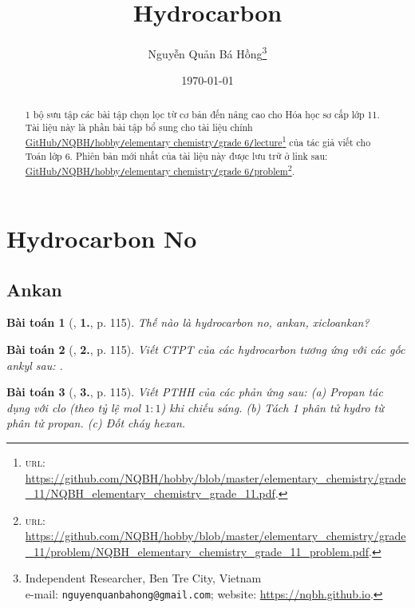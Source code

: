 \documentclass{article}
\title{Hydrocarbon}
\author{Nguyễn Quản Bá Hồng\footnote{Independent Researcher, Ben Tre City, Vietnam\\e-mail: \texttt{nguyenquanbahong@gmail.com}; website: \url{https://nqbh.github.io}.}}
\date{\today}
\numberwithin{equation}{section}
\newtheorem{baitoan}{Bài toán}[section]
\begin{document}
\maketitle
\begin{abstract}
	1 bộ sưu tập các bài tập chọn lọc từ cơ bản đến nâng cao cho Hóa học sơ cấp lớp 11. Tài liệu này là phần bài tập bổ sung cho tài liệu chính \href{https://github.com/NQBH/hobby/blob/master/elementary_chemistry/grade_11/NQBH_elementary_chemistry_grade_11.pdf}{GitHub\texttt{/}NQBH\texttt{/}hobby\texttt{/}elementary chemistry\texttt{/}grade 6\texttt{/}lecture}\footnote{\textsc{url}: \url{https://github.com/NQBH/hobby/blob/master/elementary_chemistry/grade_11/NQBH_elementary_chemistry_grade_11.pdf}.} của tác giả viết cho Toán lớp 6. Phiên bản mới nhất của tài liệu này được lưu trữ ở link sau: \href{https://github.com/NQBH/hobby/blob/master/elementary_chemistry/grade_11/problem/NQBH_elementary_chemistry_grade_11_problem.pdf}{GitHub\texttt{/}NQBH\texttt{/}hobby\texttt{/}elementary chemistry\texttt{/}grade 6\texttt{/}problem}\footnote{\textsc{url}: \url{https://github.com/NQBH/hobby/blob/master/elementary_chemistry/grade_11/problem/NQBH_elementary_chemistry_grade_11_problem.pdf}.}.
\end{abstract}
\tableofcontents
\newpage


\section{Hydrocarbon No}

\subsection{Ankan}

\begin{baitoan}[\cite{SGK_Hoa_Hoc_11_co_ban}, \textbf{1.}, p. 115]
	Thế nào là hydrocarbon no, ankan, xicloankan?
\end{baitoan}

\begin{baitoan}[\cite{SGK_Hoa_Hoc_11_co_ban}, \textbf{2.}, p. 115]
	Viết CTPT của các hydrocarbon tương ứng với các gốc ankyl sau: \emph{}.
\end{baitoan}

\begin{baitoan}[\cite{SGK_Hoa_Hoc_11_co_ban}, \textbf{3.}, p. 115]
	Viết PTHH của các phản ứng sau: (a) Propan tác dụng với clo (theo tỷ lệ mol $1:1$) khi chiếu sáng. (b) Tách 1 phân tử hydro từ phân tử propan. (c) Đốt cháy hexan.
\end{baitoan}
\end{document}
